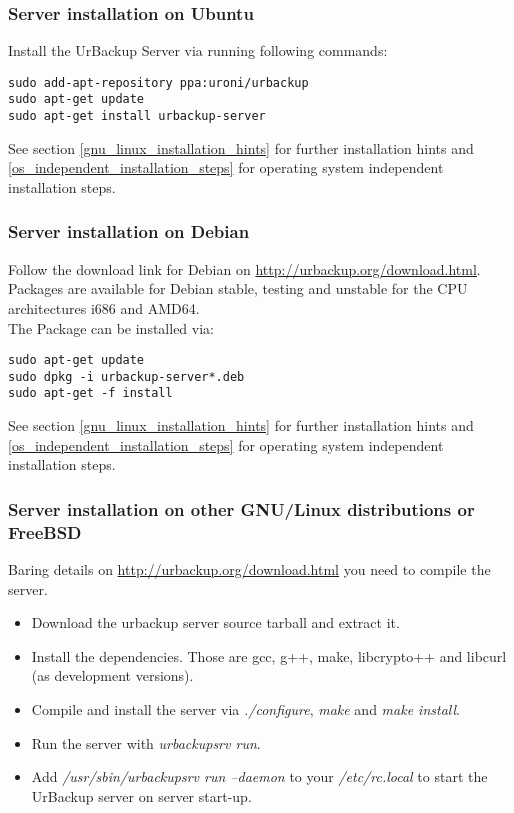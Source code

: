\documentclass[a4paper,10pt]{article}
\begin{document}
\subsubsection{Server installation on Ubuntu}

Install the UrBackup Server via running following commands:
\begin{verbatim}
sudo add-apt-repository ppa:uroni/urbackup
sudo apt-get update
sudo apt-get install urbackup-server
\end{verbatim}

\noindent See section \ref{gnu_linux_installation_hints} for further installation hints and \ref{os_independent_installation_steps} for operating system independent installation steps.


\subsubsection{Server installation on Debian}

Follow the download link for Debian on \url{http://urbackup.org/download.html}. Packages are available for Debian stable, testing and unstable for the CPU architectures i686 and AMD64.\\

\noindent The Package can be installed via:
\begin{verbatim}
sudo apt-get update
sudo dpkg -i urbackup-server*.deb
sudo apt-get -f install
\end{verbatim}

\noindent See section \ref{gnu_linux_installation_hints} for further installation hints and \ref{os_independent_installation_steps} for operating system independent installation steps.

\subsubsection{Server installation on other GNU/Linux distributions or FreeBSD}

Baring details on \url{http://urbackup.org/download.html} you need to compile the server.

\begin{itemize}
  \item Download the urbackup server source tarball and extract it.
  \item Install the dependencies. Those are gcc, g++, make, libcrypto++ and libcurl (as development versions).
  \item Compile and install the server via \textsl{./configure}, \textsl{make} and \textsl{make install}.
  \item Run the server with \textsl{urbackupsrv run}.
  \item Add \textsl{/usr/sbin/urbackupsrv run --daemon} to your \textsl{/etc/rc.local} to start the UrBackup server on server start-up.
\end{itemize}
\end{document}
